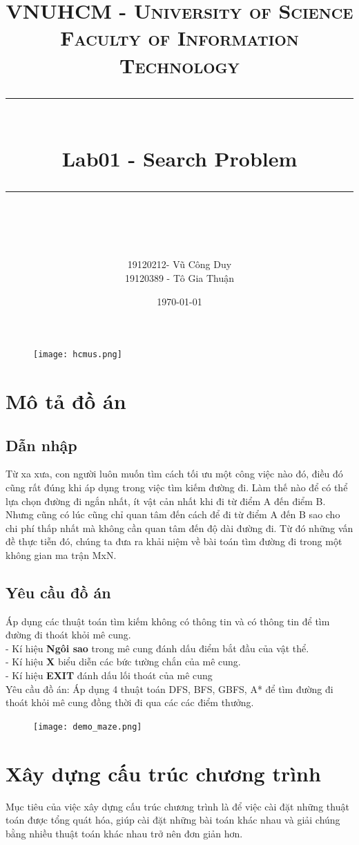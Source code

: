 \documentclass[11pt]{scrartcl} %
\title{	
	\normalfont\normalsize
	\textsc{VNUHCM - University of Science \\Faculty of Information Technology}\\ %
	\vspace{25pt} %
	\rule{\linewidth}{0.5pt}\\ %
	\vspace{20pt} %
	{\huge Lab01 - Search Problem}\\ %
	\vspace{12pt} %
	\rule{\linewidth}{2pt}\\ %
	\vspace{12pt} %
}
\author{\LARGE 19120212- Vũ Công Duy \\ \LARGE 19120389 - Tô Gia Thuận}
\date{\normalsize\today} %
\begin{document}
\maketitle 
\begin{figure}[h] %
	\centering
	\texttt{[image: hcmus.png]} %
\end{figure}

\newpage
\section{Mô tả đồ án}
\subsection{Dẫn nhập}
Từ xa xưa, con người luôn muốn tìm cách tối ưu một công việc nào đó, điều đó cũng rất đúng khi áp dụng trong việc tìm kiếm đường đi. Làm thế nào để có thể lựa chọn đường đi ngắn nhất, ít vật cản nhất khi đi từ điểm A đến điểm B. Nhưng cũng có lúc cũng chỉ quan tâm đến cách để đi từ điểm A đến B sao cho chi phí thấp nhất mà không cần quan tâm đến độ dài đường đi. Từ đó những vấn đề thực tiễn đó, chúng ta đưa ra khải niệm về bài toán tìm đường đi trong một không gian ma trận MxN.
\subsection{Yêu cầu đồ án}
 Áp dụng các thuật toán tìm kiếm không có thông tin và có thông tin để tìm đường đi thoát khỏi mê cung. 
\\- Kí hiệu \textbf{Ngôi sao} trong mê cung đánh dấu điểm bắt đầu của vật thể. 
\\- Kí hiệu \textbf{X} biểu diễn các bức tường chắn của mê cung.
\\- Kí hiệu \textbf{EXIT} đánh dấu lối thoát của mê cung
\\Yêu cầu đồ án: Áp dụng 4 thuật toán DFS, BFS, GBFS, A* để tìm đường đi thoát khỏi mê cung đồng thời đi qua các các điểm thưởng.
\begin{figure}[h] %
	\centering
	\texttt{[image: demo\_maze.png]} %
\end{figure}

\section{Xây dựng cấu trúc chương trình} \cite{standfordcs221}
Mục tiêu của việc xây dựng cấu trúc chương trình là để việc cài đặt những thuật toán được tổng quát hóa, giúp cài đặt những bài toán khác nhau và giải chúng bằng nhiều thuật toán khác nhau trở nên đơn giản hơn. 
\end{document}
